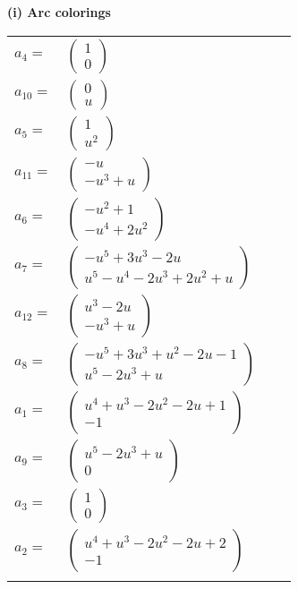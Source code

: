 \documentclass[1p]{elsarticle_modified}
\theoremstyle{definition}
\begin{document}
\flushleft \textbf{(i) Arc colorings}\\
\begin{tabular}{m{7pt} m{180pt} m{7pt} m{180pt} }
\flushright $a_{4}=$&$\begin{pmatrix}1\\0\end{pmatrix}$ \\
\flushright $a_{10}=$&$\begin{pmatrix}0\\u\end{pmatrix}$ \\
\flushright $a_{5}=$&$\begin{pmatrix}1\\u^2\end{pmatrix}$ \\
\flushright $a_{11}=$&$\begin{pmatrix}- u\\- u^3+u\end{pmatrix}$ \\
\flushright $a_{6}=$&$\begin{pmatrix}- u^2+1\\- u^4+2 u^2\end{pmatrix}$ \\
\flushright $a_{7}=$&$\begin{pmatrix}- u^5+3 u^3-2 u\\u^5- u^4-2 u^3+2 u^2+u\end{pmatrix}$ \\
\flushright $a_{12}=$&$\begin{pmatrix}u^3-2 u\\- u^3+u\end{pmatrix}$ \\
\flushright $a_{8}=$&$\begin{pmatrix}- u^5+3 u^3+u^2-2 u-1\\u^5-2 u^3+u\end{pmatrix}$ \\
\flushright $a_{1}=$&$\begin{pmatrix}u^4+u^3-2 u^2-2 u+1\\-1\end{pmatrix}$ \\
\flushright $a_{9}=$&$\begin{pmatrix}u^5-2 u^3+u\\0\end{pmatrix}$ \\
\flushright $a_{3}=$&$\begin{pmatrix}1\\0\end{pmatrix}$ \\
\flushright $a_{2}=$&$\begin{pmatrix}u^4+u^3-2 u^2-2 u+2\\-1\end{pmatrix}$\\&\end{tabular}
\end{document}
